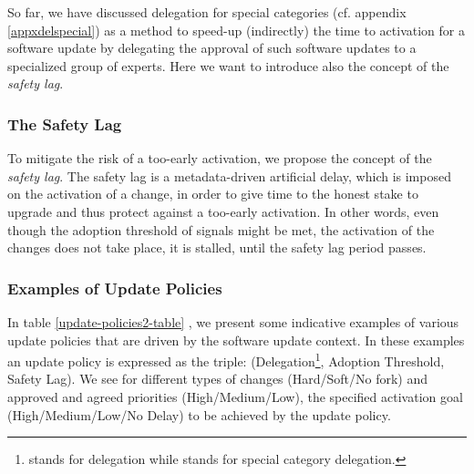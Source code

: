 So far, we have discussed delegation for special categories (cf. appendix \ref{appxdelspecial}) as a method to speed-up (indirectly) the time to activation for a software update by delegating the approval of such software updates to a specialized group of experts. Here we want to introduce also the concept of the \emph{safety lag}. %

\subsubsection{The Safety Lag}
To mitigate the risk of a too-early activation, %
we propose the concept of the \emph{safety lag}. The safety lag is a metadata-driven artificial delay, which is imposed on the activation of a change, in order to give time to the honest stake to upgrade and thus protect against a too-early activation. In other words, even though  the adoption threshold of signals might be met, the activation of the changes does not take place, it is stalled, until the safety lag period passes.


\subsubsection{Examples of Update Policies}
 In table \ref{update-policies2-table} 
, we present some indicative examples of various update policies that are driven by the software update context. In these examples an update policy is expressed as the triple: (Delegation\footnote{ stands for delegation while  stands for special category delegation. }, Adoption Threshold, Safety Lag). We see for different types of changes (Hard/Soft/No fork) and approved and agreed priorities (High/Medium/Low), the specified activation goal (High/Medium/Low/No Delay) to be achieved by the update policy.

